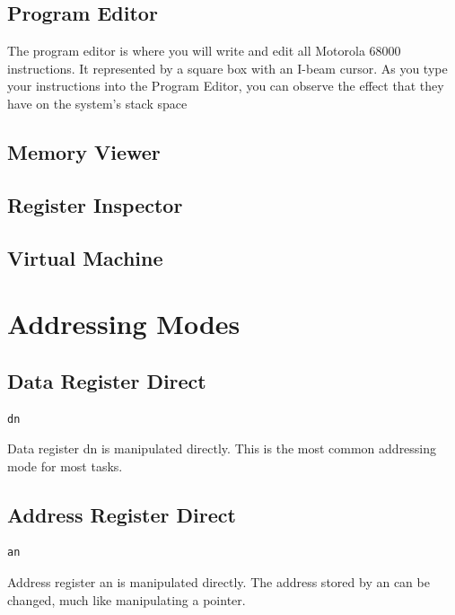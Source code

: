 \documentclass[10pt,fullpage]{article}
\begin{document}
\subsection*{Program Editor}
The program editor is where you will write and edit all Motorola
68000 instructions. It represented by a square box with an I-beam
cursor. As you type your instructions into the Program Editor, you
can observe the effect that they have on the system's stack space
\subsection*{Memory Viewer}
\subsection*{Register Inspector}

\subsection*{Virtual Machine}

\section*{Addressing Modes}

\subsection*{Data Register Direct}
\begin{verbatim}dn\end{verbatim}
Data register dn is manipulated directly. This is the most common
addressing mode for most tasks.

\subsection*{Address Register Direct}
\begin{verbatim}an\end{verbatim}
Address register an is manipulated directly. The address stored by
an can be changed, much like manipulating a pointer.
\end{document}
